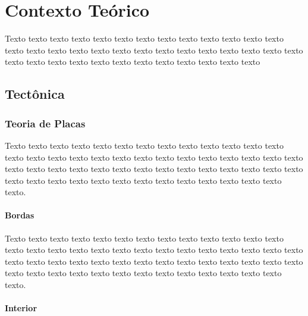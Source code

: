 \chapter{Contexto Teórico}
\label{cap:contexto}



Texto texto texto texto texto texto texto texto texto texto texto texto texto
texto texto texto texto texto texto texto texto texto texto texto texto texto
texto texto texto texto texto texto texto texto texto texto texto texto texto


\section{Tectônica}
\label{sec:fundamentos}

\subsection{Teoria de Placas}
\label{sec:fundamentos}

Texto texto texto texto texto texto texto texto texto texto texto texto texto
texto texto texto texto texto texto texto texto texto texto texto texto texto
texto texto texto texto texto texto texto texto texto texto texto texto texto
texto texto texto texto texto texto texto texto texto texto texto texto texto
texto texto texto.


\subsubsection{Bordas}
\label{sec:fundamentos}

Texto texto texto texto texto texto texto texto texto texto texto texto texto
texto texto texto texto texto texto texto texto texto texto texto texto texto
texto texto texto texto texto texto texto texto texto texto texto texto texto
texto texto texto texto texto texto texto texto texto texto texto texto texto
texto texto texto.

\subsubsection{Interior}
\label{sec:fundamentos}

